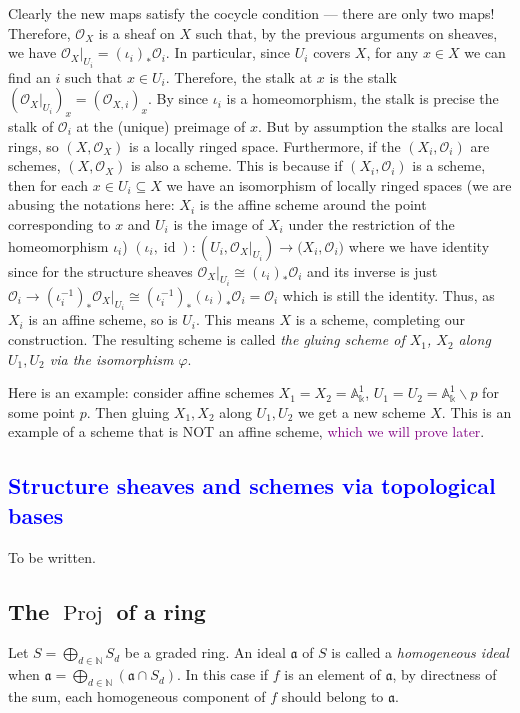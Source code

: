 \documentclass[12pt]{article}
\theoremstyle{remark}
\newcommand{\N}[0]{\mathbb{N}}
\newcommand{\Proj}[0]{\operatorname{Proj}}
\newcommand{\id}[0]{\operatorname{id}}
\begin{document}
	Clearly the new maps satisfy the cocycle condition --- there are only two maps! Therefore, $\mathscr O_X$ is a sheaf on $X$ such that, by the previous arguments on sheaves, we have $\mathscr O_X|_{U_i}=\left(\iota_{i}\right)_*\mathscr O_i$. In particular, since $U_i$ covers $X$,  for any $x\in X$ we can find an $i$ such that $x\in U_i$. Therefore, the stalk at $x$ is the stalk $\left(\mathscr O_X|_{U_i}\right)_x=\left(\mathscr O_{X, i}\right)_x$. By since $\iota_i$ is a homeomorphism, the stalk is precise the stalk of $\mathscr O_i$ at the (unique) preimage of $x$. But by assumption the stalks are local rings, so $(X,\mathscr O_X)$ is a locally ringed space. Furthermore, if the $(X_i, \mathscr O_i)$ are schemes, $(X, \mathscr O_X)$ is also a scheme. This is because if $(X_i, \mathscr O_i)$ is a scheme, then for each $x\in U_i\subseteq X$ we have an isomorphism of locally ringed spaces (we are abusing the notations here: $X_i$ is the affine scheme around the point corresponding to $x$ and $U_i$ is the image of $X_i$ under the restriction of the homeomorphism $\iota_i$) $(\iota_i, \id):(U_i, \mathscr O_X|_{U_i})\to\mathscr (X_i, \mathscr O_i)$ where we have identity since for the structure sheaves $\mathscr O_X|_{U_i}\cong (\iota_i)_*\mathscr O_i$ and its inverse is just $\mathscr O_i\to (\iota_i^{-1})_*\mathscr O_X|_{U_i}\cong(\iota_i^{-1})_*(\iota_i)_*\mathscr O_i=\mathscr O_i$ which is still the identity. Thus, as $X_i$ is an affine scheme, so is $U_i$. This means $X$ is a scheme, completing our construction. The resulting scheme is called \textit{the gluing scheme of $X_1$, $X_2$ along $U_1, U_2$ via the isomorphism $\varphi$}.

	Here is an example: consider affine schemes $X_1=X_2=\mathbb{A}_{\mathbb k}^1$, $U_1=U_2=\mathbb{A}_{\mathbb k}^1\backslash p$ for some point $p$. Then gluing $X_1, X_2$ along $U_1, U_2$ we get a new scheme $X$. This is an example of a scheme that is NOT an affine scheme, \textcolor{purple}{which we will prove later}.
	\textcolor{blue}{
	\subsection{Structure sheaves and schemes via topological bases}\label{ssec-alt-sheaves-schemes}}
	To be written.

	\subsection{The \texorpdfstring{$\Proj$}{Lg} of a ring}\label{ssec-proj}
	Let $S=\bigoplus_{d\in\mathbb N} S_d$ be a graded ring. An ideal $\mathfrak a$ of $S$ is called a \textit{homogeneous ideal} when $\mathfrak a=\bigoplus_{d\in\N} (\mathfrak a\cap S_d)$. In this case if $f$ is an element of $\mathfrak a$, by directness of the sum, each homogeneous component of $f$ should belong to $\mathfrak a$.
\end{document}
